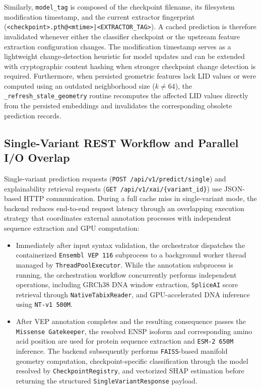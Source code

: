 Similarly, \texttt{model\_tag} is composed of the checkpoint filename, its filesystem modification timestamp, and the current extractor fingerprint (\texttt{<checkpoint>.pth@<mtime>|<EXTRACTOR\_TAG>}). A cached prediction is therefore invalidated whenever either the classifier checkpoint or the upstream feature extraction configuration changes. The modification timestamp serves as a lightweight change-detection heuristic for model updates and can be extended with cryptographic content hashing when stronger checkpoint change detection is required. Furthermore, when persisted geometric features lack $\text{LID}$ values or were computed using an outdated neighborhood size ($k \neq 64$), the \texttt{\_refresh\_stale\_geometry} routine recomputes the affected $\text{LID}$ values directly from the persisted embeddings and invalidates the corresponding obsolete prediction records.

\subsection{Single-Variant REST Workflow and Parallel I/O Overlap}

Single-variant prediction requests (\texttt{POST /api/v1/predict/single}) and explainability retrieval requests (\texttt{GET /api/v1/xai/\{variant\_id\}}) use JSON-based HTTP communication. During a full cache miss in single-variant mode, the backend reduces end-to-end request latency through an overlapping execution strategy that coordinates external annotation processes with independent sequence extraction and GPU computation:

\begin{itemize}
    \item Immediately after input syntax validation, the orchestrator dispatches the containerized \texttt{Ensembl VEP 116} subprocess to a background worker thread managed by \texttt{ThreadPoolExecutor}. While the annotation subprocess is running, the orchestration workflow concurrently performs independent operations, including GRCh38 DNA window extraction, \texttt{SpliceAI} score retrieval through \texttt{NativeTabixReader}, and GPU-accelerated DNA inference using \texttt{NT-v1 500M}.

    \item After VEP annotation completes and the resulting consequence passes the \texttt{Missense Gatekeeper}, the resolved ENSP isoform and corresponding amino acid position are used for protein sequence extraction and \texttt{ESM-2 650M} inference. The backend subsequently performs \texttt{FAISS}-based manifold geometry computation, checkpoint-specific classification through the model resolved by \texttt{CheckpointRegistry}, and vectorized SHAP estimation before returning the structured \texttt{SingleVariantResponse} payload.
\end{itemize}

